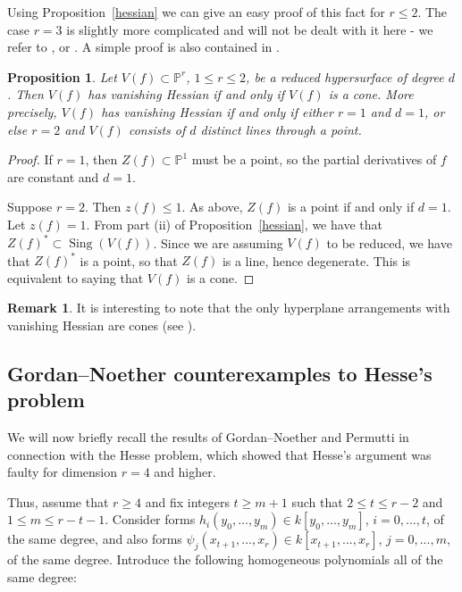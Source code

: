 \documentclass[11pt]{article}   %
\newtheorem{Proposition}[Theorem]{Proposition}
\theoremstyle{definition}
\newtheorem{Remark}[Theorem]{Remark}
\numberwithin{Theorem}{section} \numberwithin{equation}{section}
\newcommand{\Sing}{\operatorname{Sing}}
\newcommand{\p}{{\mathbb P}}
\begin{document}
{Using Proposition~\ref{hessian} we can give an easy proof of this
fact for $r\leq 2$. The case $r=3$ is slightly more complicated and
will not be dealt with it here - we refer to \cite {GN},  \cite
{Fr1} or \cite{Lossen}. A simple proof is also contained in
\cite {GR}.


\begin{Proposition}\label{lowerN} Let $V(f)\subset\p^r$, $1\leq r\leq 2$,
be a  reduced hypersurface of degree $d$. Then $V(f)$ has vanishing
Hessian if and only if $V(f)$ is a cone. More precisely, $V(f)$ has
vanishing Hessian if and only if either $r=1$ and $d=1$, or else
$r=2$ and $V(f)$ consists of $d$ distinct lines through a point.
\end{Proposition}
\begin{proof}
If $r=1$, then $Z(f)\subset\p^1$ must be a point, so the partial
derivatives of $f$ are constant and $d=1$.

Suppose $r=2$. Then $z(f)\leq 1$. As above, $Z(f)$ is a point if and
only if $d=1$. Let $z(f)=1$. From  part (ii) of
Proposition~\ref{hessian}, we have that $Z(f)^*\subset\Sing(V(f))$.
Since we are assuming $V(f)$ to be reduced,  we have that $Z(f)^*$
is a point, so that $Z(f)$ is a line, hence degenerate. This is
equivalent to saying that $V(f)$ is a cone.
\end{proof}

\begin {Remark} \label{arrangm} It is interesting to note that the only
hyperplane arrangements with vanishing Hessian are cones (see \cite[Cor. 2 and Cor. 4]{DP}).
\end {Remark}



\subsection{Gordan--Noether counterexamples to Hesse's problem}\label {GNP}



 We will now briefly
recall the results of Gordan--Noether and Permutti in connection
with the Hesse problem, which showed that Hesse's argument was
faulty for dimension $r=4$ and higher.

Thus, assume that $r\geq 4$ and fix integers $t\geq m+1$ such that
$2\leq t\leq r-2$ and $1\leq m\leq r-t-1$. Consider forms
$h_i(y_0,...,y_m)\in k[y_0,...,y_m]$, $i=0,...,t$, of the same
degree, and also forms $\psi_j(x_{t+1},...,x_r)\in
k[x_{t+1},...,x_r]$, $j=0,...,m$, of the same degree. Introduce the following
homogeneous polynomials all of the same degree:

}
\end{document}

